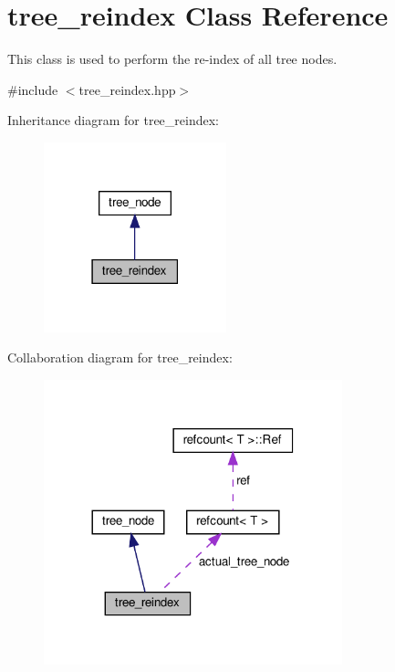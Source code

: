 \hypertarget{classtree__reindex}{}\section{tree\+\_\+reindex Class Reference}
\label{classtree__reindex}


This class is used to perform the re-\/index of all tree nodes.  




{\ttfamily \#include $<$tree\+\_\+reindex.\+hpp$>$}



Inheritance diagram for tree\+\_\+reindex\+:
\nopagebreak
\begin{figure}[H]
\begin{center}
\leavevmode
\includegraphics[width=150pt]{d1/d7c/classtree__reindex__inherit__graph}
\end{center}
\end{figure}


Collaboration diagram for tree\+\_\+reindex\+:
\nopagebreak
\begin{figure}[H]
\begin{center}
\leavevmode
\includegraphics[width=245pt]{d4/d51/classtree__reindex__coll__graph}
\end{center}
\end{figure}
